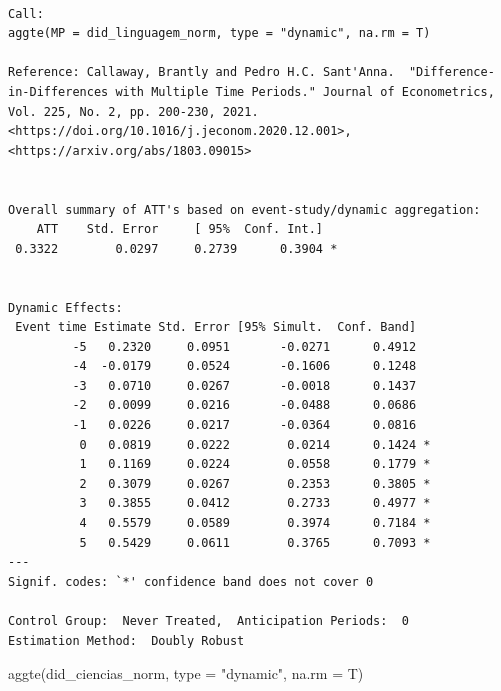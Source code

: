 \documentclass[
  letterpaper,
  DIV=11,
  numbers=noendperiod]{scrartcl}
\newenvironment{Shaded}{\begin{snugshade}}{\end{snugshade}}
\newcommand{\AttributeTok}[1]{\textcolor[rgb]{0.40,0.45,0.13}{#1}}
\newcommand{\FunctionTok}[1]{\textcolor[rgb]{0.28,0.35,0.67}{#1}}
\newcommand{\NormalTok}[1]{\textcolor[rgb]{0.00,0.23,0.31}{#1}}
\newcommand{\StringTok}[1]{\textcolor[rgb]{0.13,0.47,0.30}{#1}}
\begin{document}
\begin{verbatim}

Call:
aggte(MP = did_linguagem_norm, type = "dynamic", na.rm = T)

Reference: Callaway, Brantly and Pedro H.C. Sant'Anna.  "Difference-in-Differences with Multiple Time Periods." Journal of Econometrics, Vol. 225, No. 2, pp. 200-230, 2021. <https://doi.org/10.1016/j.jeconom.2020.12.001>, <https://arxiv.org/abs/1803.09015> 


Overall summary of ATT's based on event-study/dynamic aggregation:  
    ATT    Std. Error     [ 95%  Conf. Int.]  
 0.3322        0.0297     0.2739      0.3904 *


Dynamic Effects:
 Event time Estimate Std. Error [95% Simult.  Conf. Band]  
         -5   0.2320     0.0951       -0.0271      0.4912  
         -4  -0.0179     0.0524       -0.1606      0.1248  
         -3   0.0710     0.0267       -0.0018      0.1437  
         -2   0.0099     0.0216       -0.0488      0.0686  
         -1   0.0226     0.0217       -0.0364      0.0816  
          0   0.0819     0.0222        0.0214      0.1424 *
          1   0.1169     0.0224        0.0558      0.1779 *
          2   0.3079     0.0267        0.2353      0.3805 *
          3   0.3855     0.0412        0.2733      0.4977 *
          4   0.5579     0.0589        0.3974      0.7184 *
          5   0.5429     0.0611        0.3765      0.7093 *
---
Signif. codes: `*' confidence band does not cover 0

Control Group:  Never Treated,  Anticipation Periods:  0
Estimation Method:  Doubly Robust
\end{verbatim}

\begin{Shaded}
\begin{Highlighting}[]
\FunctionTok{aggte}\NormalTok{(did\_ciencias\_norm, }\AttributeTok{type =} \StringTok{"dynamic"}\NormalTok{, }\AttributeTok{na.rm =}\NormalTok{ T)}
\end{Highlighting}
\end{Shaded}
\end{document}
